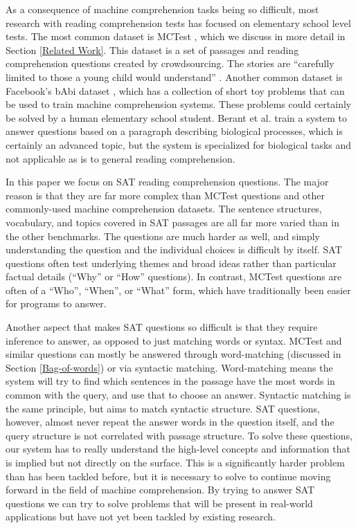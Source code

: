 \documentclass[pageno]{final_paper}
\begin{document}
As a consequence of machine comprehension tasks being so difficult, most
research with reading comprehension tests has focused on elementary school level
tests. The most common dataset is MCTest \cite{Richardson2013}, which we discuss
in more detail in Section \ref{Related Work}. This dataset is a set of passages
and reading comprehension questions created by crowdsourcing. The stories are
``carefully limited to those a young child would understand''
\cite{Richardson2013}. Another common dataset is Facebook's bAbi dataset
\cite{Weston2015}, which has a collection of short toy problems that can be used
to train machine comprehension systems. These problems could certainly be solved
by a human elementary school student. Berant et al. \cite{Berant2014} train a
system to answer questions based on a paragraph describing biological processes,
which is certainly an advanced topic, but the system is specialized for
biological tasks and not applicable as is to general reading comprehension.

In this paper we focus on SAT reading comprehension questions. The major reason
is that they are far more complex than MCTest questions and other commonly-used
machine comprehension datasets. The sentence structures, vocabulary, and topics
covered in SAT passages are all far more varied than in the other benchmarks.
The questions are much harder as well, and simply understanding the question and
the individual choices is difficult by itself. SAT questions often test
underlying themes and broad ideas rather than particular factual details
(``Why'' or ``How'' questions). In contrast, MCTest questions are often of a
``Who'', ``When'', or ``What'' form, which have traditionally been easier for
programs to answer.

Another aspect that makes SAT questions so difficult is that they require
inference to answer, as opposed to just matching words or syntax. MCTest and
similar questions can mostly be answered through word-matching (discussed in
Section \ref{Bag-of-words}) or via syntactic matching. Word-matching means the
system will try to find which sentences in the passage have the most words in
common with the query, and use that to choose an answer. Syntactic matching is
the same principle, but aims to match syntactic structure. SAT questions,
however, almost never repeat the answer words in the question itself, and the
query structure is not correlated with passage structure. To solve these
questions, our system has to really understand the high-level concepts and
information that is implied but not directly on the surface. This is a
significantly harder problem than has been tackled before, but it is necessary
to solve to continue moving forward in the field of machine comprehension. By
trying to answer SAT questions we can try to solve problems that will be present
in real-world applications but have not yet been tackled by existing research.
\end{document}
